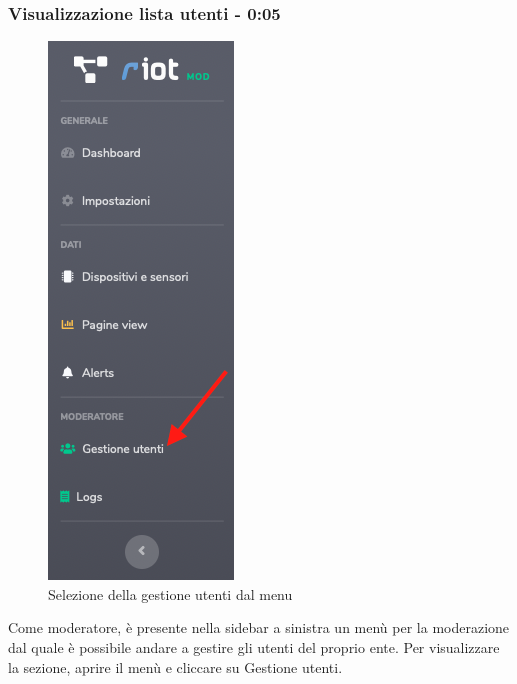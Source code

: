 	\subsubsection{Visualizzazione lista utenti - 0:05}
	\begin{figure}[H]
		\centering
		\includegraphics[scale=0.600]{res/images/mod/menuUtente.png}
		\caption{Selezione della gestione utenti dal menu}
	\end{figure}
		Come moderatore, è presente nella sidebar a sinistra un menù per la moderazione dal quale è possibile andare a gestire gli utenti del proprio ente.
		Per visualizzare la sezione, aprire il menù e cliccare su Gestione utenti.

